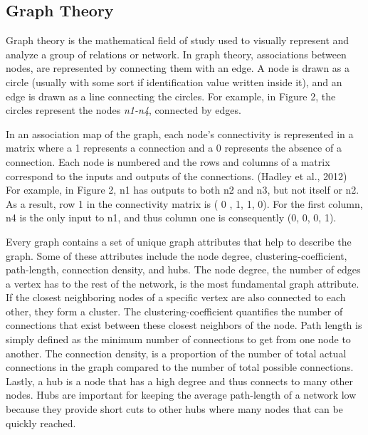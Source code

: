 \documentclass[11pt,letterpaper,doublespacing,titlepage]{article}
\begin{document}
\subsection{Graph Theory}
\par
Graph theory is the mathematical field of study used to visually represent and analyze a group of relations or network. In graph theory, associations between nodes, are represented by connecting them with an edge. A node is drawn as a circle (usually with some sort if identification value written inside it), and an edge is drawn as a line connecting the circles. For example, in Figure 2, the circles represent the nodes \textit{n1-n4}, connected by edges.
\par
In an association map of the graph, each node’s connectivity is represented in a matrix where a 1 represents a connection and a 0 represents the absence of a connection. Each node is numbered and the rows and columns of a matrix correspond to the inputs and outputs of the connections. (Hadley et al., 2012) For example, in Figure 2, n1 has outputs to both n2 and n3, but not itself or n2. As a result, row 1 in the connectivity matrix is ( 0 , 1, 1, 0). For the first column, n4 is the only input to n1, and thus column one is consequently (0, 0, 0, 1). 
\par
Every graph contains a set of unique graph attributes that help to describe the graph. Some of these attributes include the node degree, clustering-coefficient, path-length, connection  density, and hubs. The node degree, the number of edges a vertex has to the rest of the network, is the most fundamental graph attribute. If the closest neighboring nodes of a specific vertex are also connected to each other, they form a cluster. The clustering-coefficient quantifies the number of connections that exist between these closest neighbors of the node. Path length is simply defined as the minimum number of connections to get from one node to another. The connection density, is a proportion of the number of total actual connections in the graph compared to the number of total possible connections. Lastly, a hub is a node that has a high degree and thus connects to many other nodes. Hubs are important for keeping the average path-length of a network low because they provide short cuts to other hubs where many nodes that can be quickly reached. 

\end{document}
